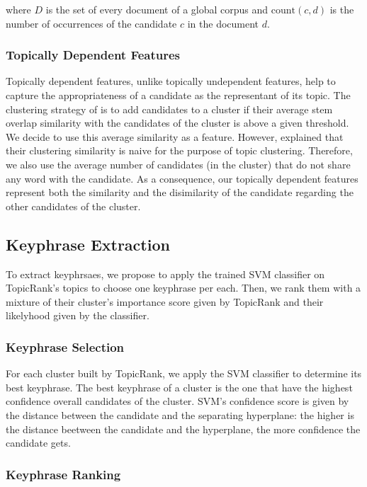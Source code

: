       where $D$ is the set of every document of a global corpus and
      $\text{count}(c, d)$ is the number of occurrences of the candidate $c$ in
      the document $d$.

    \subsubsection{Topically Dependent Features}
    \label{subsubsec:topically_dependent_features}
      Topically dependent features, unlike topically undependent features, help
      to capture the appropriateness of a candidate as the representant of its
      topic. The clustering strategy of  is to
      add candidates to a cluster if their average stem overlap similarity with
      the candidates of the cluster is above a given threshold. We decide to
      use this average similarity as a feature. However,
       explained that their clustering similarity
      is naive for the purpose of topic clustering. Therefore, we also use the
      average number of candidates (in the cluster) that do not share any word
      with the candidate. As a consequence, our topically dependent features
      represent both the similarity and the disimilarity of the candidate
      regarding the other candidates of the cluster.

  \subsection{Keyphrase Extraction}
  \label{subsec:keyphrase_extraction}
    To extract keyphrsaes, we propose to apply the trained SVM classifier on
    TopicRank's topics to choose one keyphrase per each. Then, we rank them
    with a mixture of their cluster's importance score given by TopicRank and
    their likelyhood given by the classifier.

    \subsubsection{Keyphrase Selection}
    \label{subsubsec:keyphrase_selection}
      For each cluster built by TopicRank, we apply the SVM classifier to
      determine its best keyphrase. The best keyphrase of a cluster is the one
      that have the highest confidence overall candidates of the cluster. SVM's
      confidence score is given by the distance between the candidate and the
      separating hyperplane: the higher is the distance beetween the candidate
      and the hyperplane, the more confidence the candidate gets.

    \subsubsection{Keyphrase Ranking}
    \label{subsubsec:keyphrase_reranking}

